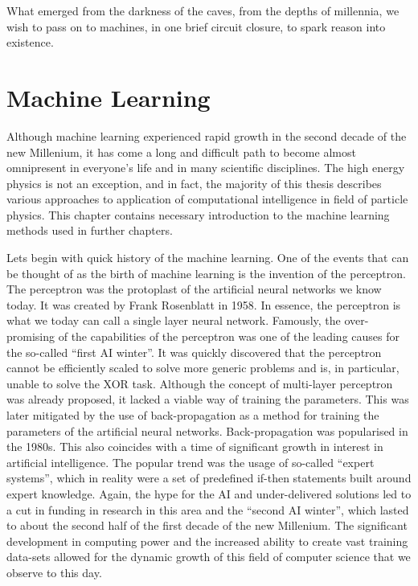 \begin{savequote}[75mm]
What emerged from the darkness of the caves, from the depths of millennia, we wish to pass on to machines, in one brief circuit closure, to spark reason into existence.
\end{savequote}


\chapter{Machine Learning }
\label{chap:ml}

Although machine learning experienced rapid growth in the second decade of the new Millenium, it has come a long and difficult path to become almost omnipresent in everyone's life and in many scientific disciplines.
The high energy physics is not an exception, and in fact, the majority of this thesis describes various approaches to application of computational intelligence in field of particle physics.
This chapter contains necessary introduction to the machine learning methods used in further chapters.

Lets begin with quick history of the machine learning. One of the events that can be thought of as the birth of machine learning is the invention of the perceptron.
The perceptron was the protoplast of the artificial neural networks we know today. It was created by Frank Rosenblatt \cite{Rosenblatt1958ThePA} in 1958.
In essence, the perceptron is what we today can call a single layer neural network.
Famously, the over-promising of the capabilities of the perceptron was one of the leading causes for the so-called ``first AI winter''\cite{enwiki:1076647189}.
It was quickly discovered that the perceptron cannot be efficiently scaled to solve more generic problems and is, in particular, unable to solve the XOR task.
Although the concept of multi-layer perceptron was already proposed, it lacked a viable way of training the parameters.
This was later mitigated by the use of back-propagation as a method for training the parameters of the artificial neural networks.
Back-propagation was popularised in the 1980s. This also coincides with a time of significant growth in interest in artificial intelligence.
The popular trend was the usage of so-called ``expert systems'', which in reality were a set of predefined if-then statements built around expert knowledge.
Again, the hype for the AI and under-delivered solutions led to a cut in funding in research in this area and the ``second AI winter'', which lasted to about the second half of the first decade of the new Millenium.
The significant development in computing power and the increased ability to create vast training data-sets allowed for the dynamic growth of this field of computer science that we observe to this day.

